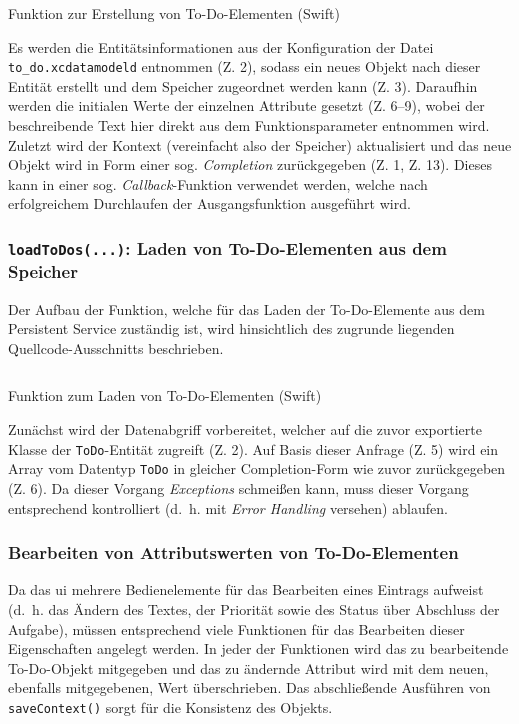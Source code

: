 \begin{listing}[H]
	\inputminted{Swift}{sourcecode/ios_createToDo.swift}	
	\caption{Funktion zur Erstellung von To-Do-Elementen (Swift)}
\end{listing}

Es werden die Entitätsinformationen aus der Konfiguration der Datei \texttt{to\_do.xcdatamodeld} entnommen (Z. 2), sodass ein neues Objekt nach dieser Entität erstellt und dem Speicher zugeordnet werden kann (Z. 3). Daraufhin werden die initialen Werte der einzelnen Attribute gesetzt (Z. 6--9), wobei der beschreibende Text hier direkt aus dem Funktionsparameter entnommen wird. Zuletzt wird der Kontext (vereinfacht also der Speicher) aktualisiert und das neue Objekt wird in Form einer sog. \textit{Completion} zurückgegeben (Z. 1, Z. 13). Dieses kann in einer sog. \textit{Callback}-Funktion verwendet werden, welche nach erfolgreichem Durchlaufen der Ausgangsfunktion ausgeführt wird.

\subsubsection{\texttt{loadToDos(...)}: Laden von To-Do-Elementen aus dem Speicher} \label{chap:ios_load_todos}
Der Aufbau der Funktion, welche für das Laden der To-Do-Elemente aus dem Persistent Service zuständig ist, wird hinsichtlich des zugrunde liegenden Quellcode-Ausschnitts beschrieben.

\begin{listing}[H]
	\inputminted{Swift}{sourcecode/ios_loadToDos.swift}	
	\caption{Funktion zum Laden von To-Do-Elementen (Swift)}
\end{listing}

Zunächst wird der Datenabgriff vorbereitet, welcher auf die zuvor exportierte Klasse der \texttt{ToDo}-Entität zugreift (Z. 2). Auf Basis dieser Anfrage (Z. 5) wird ein Array vom Datentyp \texttt{ToDo} in gleicher Completion-Form wie zuvor zurückgegeben (Z. 6). Da dieser Vorgang \textit{Exceptions} schmeißen kann, muss dieser Vorgang entsprechend kontrolliert (d.\ h. mit \textit{Error Handling} versehen) ablaufen.

\subsubsection{Bearbeiten von Attributswerten von To-Do-Elementen}
Da das \ac{ui} mehrere Bedienelemente für das Bearbeiten eines Eintrags aufweist (d.\ h. das Ändern des Textes, der Priorität sowie des Status über Abschluss der Aufgabe), müssen entsprechend viele Funktionen für das Bearbeiten dieser Eigenschaften angelegt werden. In jeder der Funktionen wird das zu bearbeitende To-Do-Objekt mitgegeben und das zu ändernde Attribut wird mit dem neuen, ebenfalls mitgegebenen, Wert überschrieben. Das abschließende Ausführen von \texttt{saveContext()} sorgt für die Konsistenz des Objekts.

